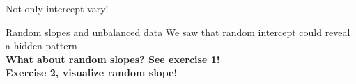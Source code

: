 \documentclass{beamer}
\begin{document}
\begin{frame}{Not only intercept vary!}
\centering
\end{frame}

\begin{frame}{Random slopes and unbalanced data}
 We saw that random intercept could reveal a hidden pattern\\
 \textbf{What about random slopes? See exercise 1!}\\
 
 \pause
 \vfill
 \textbf{Exercise 2, visualize random slope!}\\
 \pause
\end{frame}
\end{document}
